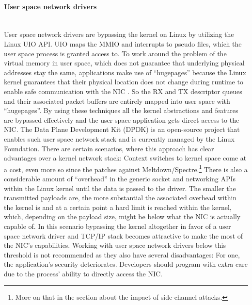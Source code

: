 \paragraph{User space network drivers}\mbox{}\\
User space network drivers are bypassing the kernel on Linux by utilizing the Linux UIO API. UIO maps the MMIO and interrupts to pseudo files, which the user space process is granted access to. To work around the problem of the virtual memory in user space, which does not guarantee that underlying physical addresses stay the same, applications make use of “hugepages” because the Linux kernel guarantees that their physical location does not change during runtime to enable safe communication with the NIC \cite{linux:dpdk}. So the RX and TX descriptor queues and their associated packet buffers are entirely mapped into user space with “hugepages”. By using these techniques all the kernel abstractions and features are bypassed effectively and the user space application gets direct access to the NIC. \newline
The Data Plane Development Kit (DPDK) is an open-source project that enables such user space network stack and is currently managed by the Linux Foundation. \newline
There are certain scenarios, where this approach has clear advantages over a kernel network stack: \newline
Context switches to kernel space come at a cost, even more so since the patches against Meltdown/Spectre.\footnote{More on that in the section about the impact of side-channel attacks.}\newline
There is also a considerable amount of “overhead” in the generic socket and networking APIs within the Linux kernel until the data is passed to the driver. The smaller the transmitted payloads are, the more substantial the associated overhead within the kernel is and at a certain point a hard limit is reached within the kernel, which, depending on the payload size, might be below what the NIC is actually capable of.
In this scenario bypassing the kernel altogether in favor of a user space network driver and TCP/IP stack becomes attractive to make the most of the NIC’s capabilities.
Working with user space network drivers below this threshold is not recommended as they also have several disadvantages: \newline
For one, the application’s security deteriorates. Developers should program with extra care due to the process' ability to directly access the NIC. \newline
